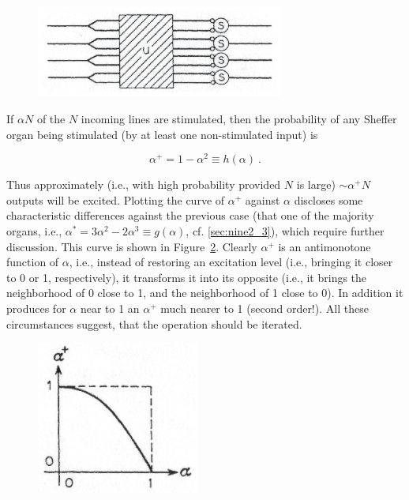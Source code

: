 \documentclass[twocolumn,preprintnumbers,amsmath,amssymb,floatfix]{revtex4}
\begin{document}
\begin{figure}[b]
\includegraphics[width=3.2in]{fig_35}
\caption{\label{fig:35}}
\end{figure}

If $\alpha N$ of the $N$ incoming lines are stimulated, then the
probability of any Sheffer organ being stimulated (by at least one
non-stimulated input) is

\begin{equation}
\alpha^+=1-\alpha^2\equiv h(\alpha)~. \label{eq:15}
\end{equation}

\noindent Thus approximately (i.e., with high probability provided
$N$ is large) $\sim \alpha^+N$ outputs will be excited. Plotting
the curve of $\alpha^+$ against $\alpha$ discloses some
characteristic differences against the previous case (that one of
the majority organs, i.e., $\alpha^*=3\alpha^2-2\alpha^3\equiv
g(\alpha)$, cf. \ref{sec:nine2_3}), which require further
discussion. This curve is shown in Figure~\ref{fig:36}. Clearly
$\alpha^+$ is an antimonotone function of $\alpha$, i.e., instead
of restoring an excitation level (i.e., bringing it closer to 0 or
1, respectively), it transforms it into its opposite (i.e., it
brings the neighborhood of 0 close to 1, and the neighborhood of 1
close to 0). In addition it produces for $\alpha$ near to 1 an
$\alpha^+$ much nearer to 1 (second order!). All these
circumstances suggest, that the operation should be iterated.

\begin{figure}
\includegraphics[width=2.1in]{fig_36}
\caption{\label{fig:36}}
\end{figure}
\end{document}
